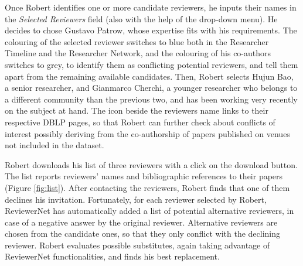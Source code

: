 Once Robert identifies one or more candidate reviewers, he inputs their names in the \emph{Selected Reviewers} field (also with the help of the drop-down menu). He decides to chose Gustavo Patrow, whose expertise fits with his requirements.  The colouring of the selected reviewer switches to blue both in the Researcher Timeline and the Researcher Network, and the colouring of his co-authors switches to grey, to identify them as conflicting potential reviewers, and tell them apart from the remaining available candidates. Then, Robert selects Hujun Bao, a senior researcher, and Gianmarco  Cherchi, a younger researcher who belongs to a different community than the previous two, and has been working very recently on the subject at hand. The icon beside the reviewers name links to their respective DBLP pages, so that Robert can further check about conflicts of interest possibly deriving from the co-authorship of papers published on venues not included in the dataset.

Robert downloads his list of three reviewers with a click on the download button. The list reports reviewers' names and bibliographic references to their papers (Figure \ref{fig:list}). After contacting the reviewers, Robert finds that one of them declines his invitation. Fortunately, for each reviewer selected by Robert, ReviewerNet has automatically added a list of potential alternative reviewers, in case of a negative answer by the original reviewer. Alternative reviewers are chosen from the candidate ones, so that they only conflict with the declining reviewer. Robert evaluates possible substitutes, again taking advantage of ReviewerNet functionalities, and finds his best replacement. 

